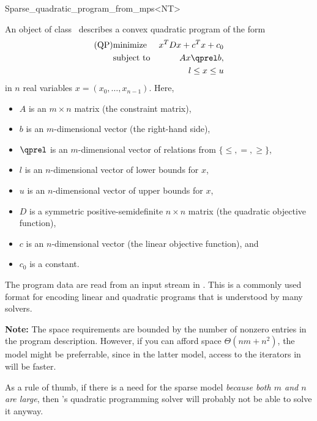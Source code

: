 \begin{ccRefClass}{Sparse_quadratic_program_from_mps<NT>}


\ccDefinition
An object of class \ccRefName\ describes a convex quadratic program of the form
\begin{eqnarray*}
\mbox{(QP)}& \mbox{minimize} & x^{T}Dx+c^{T}x+c_0 \\
&\mbox{subject to}   & Ax\qprel b, \\
&                    & l \leq x \leq u
\end{eqnarray*}
in $n$ real variables $x=(x_0,\ldots,x_{n-1})$.
Here, 
\begin{itemize}
\item $A$ is an $m\times n$ matrix (the constraint matrix), 
\item $b$ is an $m$-dimensional vector (the right-hand side),
\item $\qprel$ is an $m$-dimensional vector of relations 
from $\{\leq, =, \geq\}$, 
\item $l$ is an $n$-dimensional vector of lower
bounds for $x$,
\item $u$ is an $n$-dimensional vector of upper bounds for
$x$, 
\item $D$ is a symmetric positive-semidefinite $n\times n$ matrix (the
  quadratic objective function),
\item $c$ is an $n$-dimensional vector (the linear objective
  function), and 
\item $c_0$ is a constant.
\end{itemize}

The program data are read from an input stream in . This is
a commonly used format for encoding linear and quadratic programs that
is understood by many solvers. 

\textbf{Note:} 
The space requirements are bounded by the number of nonzero entries
in the program description. However, if you can afford space
$\Theta(nm + n^2)$, the model 
might be preferrable, since in the latter model, access to the iterators 
in  will be faster.

As a rule of thumb, if there is a need for the sparse model
\emph{because both $m$ and $n$ are large}, then \cgal's quadratic
programming solver will probably not be able to solve it anyway.

\ccIsModel
{}


\end{ccRefClass}

